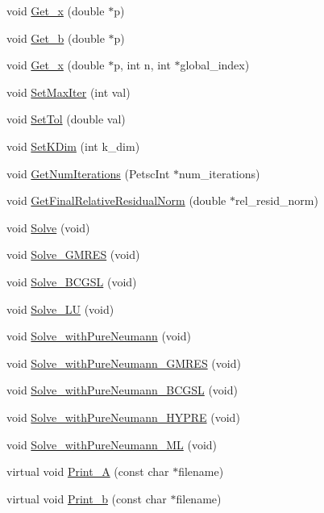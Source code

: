\begin{DoxyCompactItemize}
\item 
void \hyperlink{class_p_e_t_sc_a148a2dee9beca138a2306d422c46ccab}{Get\+\_\+x} (double $\ast$p)
\item 
void \hyperlink{class_p_e_t_sc_a73343d0889416522148bade9a98297c6}{Get\+\_\+b} (double $\ast$p)
\item 
void \hyperlink{class_p_e_t_sc_ac907bd0e8fe565355fb64db24e8e79a0}{Get\+\_\+x} (double $\ast$p, int n, int $\ast$global\+\_\+index)
\item 
void \hyperlink{class_p_e_t_sc_a5d1cbdb72ebeb425d0b2219b5a71e622}{Set\+Max\+Iter} (int val)
\item 
void \hyperlink{class_p_e_t_sc_a77e13de268df99cdca97fcd3b760cd01}{Set\+Tol} (double val)
\item 
void \hyperlink{class_p_e_t_sc_a37454581b9fde90de6494268cda4cfa4}{Set\+K\+Dim} (int k\+\_\+dim)
\item 
void \hyperlink{class_p_e_t_sc_a2edffec3bec5ef5653f76c7fa8ebfcc1}{Get\+Num\+Iterations} (Petsc\+Int $\ast$num\+\_\+iterations)
\item 
void \hyperlink{class_p_e_t_sc_a042ce6d837b001bfd1da3cf2970b8303}{Get\+Final\+Relative\+Residual\+Norm} (double $\ast$rel\+\_\+resid\+\_\+norm)
\item 
void \hyperlink{class_p_e_t_sc_ae3daeeb92489271152dfcb642553f256}{Solve} (void)
\item 
void \hyperlink{class_p_e_t_sc_af33181fa627e9294a68b582d9b410254}{Solve\+\_\+\+G\+M\+R\+ES} (void)
\item 
void \hyperlink{class_p_e_t_sc_a534620acec523ffdb663f2bf6a8bfa8d}{Solve\+\_\+\+B\+C\+G\+SL} (void)
\item 
void \hyperlink{class_p_e_t_sc_a28e74fbd2592892fddf9e63401202456}{Solve\+\_\+\+LU} (void)
\item 
void \hyperlink{class_p_e_t_sc_a256d7543b87f3facac462b94d5bfdeb1}{Solve\+\_\+with\+Pure\+Neumann} (void)
\item 
void \hyperlink{class_p_e_t_sc_aeb804d96036f2447e401e28cfe2c1fa4}{Solve\+\_\+with\+Pure\+Neumann\+\_\+\+G\+M\+R\+ES} (void)
\item 
void \hyperlink{class_p_e_t_sc_a4295c88d019aa91c37464af1b83f1f26}{Solve\+\_\+with\+Pure\+Neumann\+\_\+\+B\+C\+G\+SL} (void)
\item 
void \hyperlink{class_p_e_t_sc_a8c68d589fc84c3c28cb03c84b59598e0}{Solve\+\_\+with\+Pure\+Neumann\+\_\+\+H\+Y\+P\+RE} (void)
\item 
void \hyperlink{class_p_e_t_sc_a04552d36e36759325ed15c20b69f2b5d}{Solve\+\_\+with\+Pure\+Neumann\+\_\+\+ML} (void)
\item 
virtual void \hyperlink{class_p_e_t_sc_a58deebf3ff7d5d186ce8ee282668baf5}{Print\+\_\+A} (const char $\ast$filename)
\item 
virtual void \hyperlink{class_p_e_t_sc_a1aab12e68cbb2230e4417a891059fcfc}{Print\+\_\+b} (const char $\ast$filename)
\end{DoxyCompactItemize}
